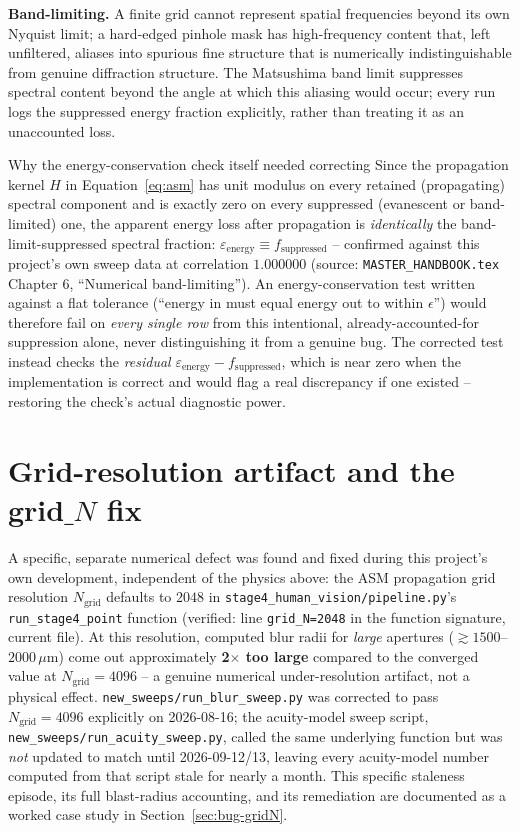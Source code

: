 \textbf{Band-limiting.} A finite grid cannot represent spatial frequencies beyond its
own Nyquist limit; a hard-edged pinhole mask has high-frequency content that, left
unfiltered, aliases into spurious fine structure that is numerically indistinguishable
from genuine diffraction structure. The Matsushima band limit \citep{matsushima2009} suppresses spectral
content beyond the angle at which this aliasing would occur; every run logs the
suppressed energy fraction explicitly, rather than treating it as an unaccounted loss.

\begin{keybox}{Why the energy-conservation check itself needed correcting}
Since the propagation kernel $H$ in Equation~\ref{eq:asm} has unit modulus on every
retained (propagating) spectral component and is exactly zero on every suppressed
(evanescent or band-limited) one, the apparent energy loss after propagation is
\emph{identically} the band-limit-suppressed spectral fraction:
$\varepsilon_{\mathrm{energy}} \equiv f_{\mathrm{suppressed}}$ -- confirmed against this
project's own sweep data at correlation $1.000000$ (source: \texttt{MASTER\_HANDBOOK.tex}
Chapter 6, ``Numerical band-limiting''). An energy-conservation test written against a
flat tolerance (``energy in must equal energy out to within $\epsilon$'') would
therefore fail on \emph{every single row} from this intentional, already-accounted-for
suppression alone, never distinguishing it from a genuine bug. The corrected test
instead checks the \emph{residual}
$\varepsilon_{\mathrm{energy}} - f_{\mathrm{suppressed}}$, which is near zero when the
implementation is correct and would flag a real discrepancy if one existed -- restoring
the check's actual diagnostic power.
\end{keybox}

\section{Grid-resolution artifact and the grid$\_N$ fix}
\label{sec:gridN}
A specific, separate numerical defect was found and fixed during this project's own
development, independent of the physics above: the ASM propagation grid resolution
$N_{\mathrm{grid}}$ defaults to $2048$ in
\texttt{stage4\_human\_vision/pipeline.py}'s \texttt{run\_stage4\_point} function
(verified: line \texttt{grid\_N=2048} in the function signature, current file). At this
resolution, computed blur radii for \emph{large} apertures ($\gtrsim1500$--$2000\,\mu$m)
come out approximately \textbf{2$\times$ too large} compared to the converged value at
$N_{\mathrm{grid}}=4096$ -- a genuine numerical under-resolution artifact, not a
physical effect. \texttt{new\_sweeps/run\_blur\_sweep.py} was corrected to pass
$N_{\mathrm{grid}}=4096$ explicitly on 2026-08-16; the acuity-model sweep script,
\texttt{new\_sweeps/run\_acuity\_sweep.py}, called the same underlying function but was
\emph{not} updated to match until 2026-09-12/13, leaving every acuity-model number
computed from that script stale for nearly a month. This specific staleness episode,
its full blast-radius accounting, and its remediation are documented as a worked case
study in Section~\ref{sec:bug-gridN}.

